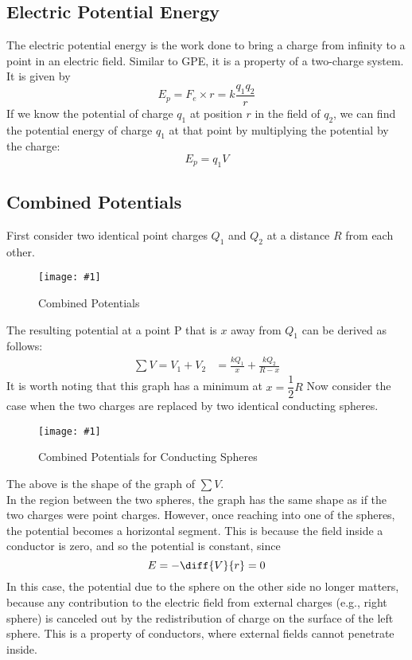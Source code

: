 \documentclass[a4paper,12pt]{article}
\newcommand{\lb}{\\[8pt]}
\newcommand{\img}[4]{\begin{center}
  \begin{figure}[H]
    \centering
    \texttt{[image: \#1]}
    \caption{#3}
    \label{fig:#4}
  \end{figure}
\end{center}}
\begin{document}
\subsection{Electric Potential Energy}

The electric potential energy is the work done to bring a charge from infinity to a point in an electric field. Similar to GPE, it is a property of a two-charge system. It is given by
\begin{equation}\label{eq:epe}
  E_p = F_e\times r = k\frac{q_1q_2}{r}
\end{equation}
If we know the potential of charge $q_1$ at position $r$ in the field of $q_2$, we can find the potential energy of charge $q_1$ at that point by multiplying the potential by the charge:
\begin{equation}\label{eq:epe2}
  E_p = q_1V
\end{equation}

\pagebreak

\subsection{Combined Potentials}

First consider two identical point charges $Q_1$ and $Q_2$ at a distance $R$ from each other.
\img{combined.png}{0.9}{Combined Potentials}{combined}
The resulting potential at a point P that is $x$ away from $Q_1$ can be derived as follows:
\begin{align*}
  \sum V = V_1 + V_2 & = \frac{kQ_1}{x} + \frac{kQ_2}{R - x}
\end{align*}
It is worth noting that this graph has a minimum at $x = \dfrac{1}{2} R$
Now consider the case when the two charges are replaced by two identical conducting spheres.
\img{combinedhollow.png}{0.9}{Combined Potentials for Conducting Spheres}{combinedhollow}
The above is the shape of the graph of $\sum V$.\lb
In the region between the two spheres, the graph has the same shape as if the two charges were point charges. However, once reaching into one of the spheres, the potential becomes a horizontal segment. This is because the field inside a conductor is zero, and so the potential is constant, since $$E = -\diff{V}{r} = 0$$
In this case, the potential due to the sphere on the other side no longer matters, because any contribution to the electric field from external charges (e.g., right sphere) is canceled out by the redistribution of charge on the surface of the left sphere. This is a property of conductors, where external fields cannot penetrate inside.
\end{document}
